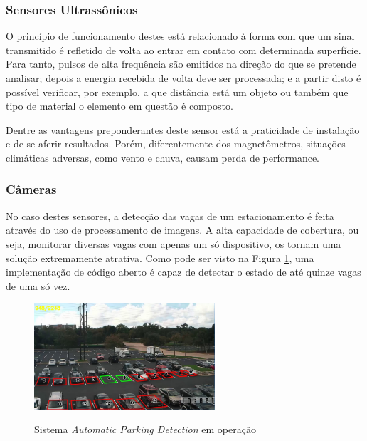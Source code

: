 \documentclass[oneside,openright,12pt]{ufsm_2015} %
\begin{document}
\subsubsection{Sensores Ultrassônicos}
O princípio de funcionamento destes está relacionado à forma com que um sinal transmitido é refletido de volta ao entrar em contato com determinada superfície. Para tanto, pulsos de alta frequência são emitidos na direção do que se pretende analisar; depois a energia recebida de volta deve ser processada; e a partir disto é possível verificar, por exemplo, a que distância está um objeto ou também que tipo de material o elemento em questão é composto.

Dentre as vantagens preponderantes deste sensor está a praticidade de instalação e de se aferir resultados. Porém, diferentemente dos magnetômetros, situações climáticas adversas, como vento e chuva, causam perda de performance.

\subsubsection{Câmeras}
No caso destes sensores, a detecção das vagas de um estacionamento é feita através do uso de processamento de imagens. A alta capacidade de cobertura, ou seja, monitorar diversas vagas com apenas um só dispositivo, os tornam uma solução extremamente atrativa. Como pode ser visto na Figura \ref{fig:repoparking}, uma implementação de código aberto é capaz de detectar o estado de até quinze vagas de uma só vez.

\begin{figure}[H]
    \caption{\label{exepretex} Sistema \textit{Automatic Parking Detection} em operação}
    \centering
    \includegraphics[width=0.6\textwidth]{figuras/automatic-parking-detection.png}
    \vspace{\baselineskip} %
        \label{fig:repoparking}
\end{figure}
\end{document}
